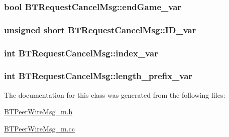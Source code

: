 \subsubsection[{end\+Game\+\_\+var}]{\setlength{\rightskip}{0pt plus 5cm}bool B\+T\+Request\+Cancel\+Msg\+::end\+Game\+\_\+var\hspace{0.3cm}{\ttfamily [protected]}}\label{classBTRequestCancelMsg_a8ebc13d1af28901ca455cbda02c29d52}
\hypertarget{classBTRequestCancelMsg_ad687b551062827df1f6f9a65b6c19782}{}
\subsubsection[{I\+D\+\_\+var}]{\setlength{\rightskip}{0pt plus 5cm}unsigned short B\+T\+Request\+Cancel\+Msg\+::\+I\+D\+\_\+var\hspace{0.3cm}{\ttfamily [protected]}}\label{classBTRequestCancelMsg_ad687b551062827df1f6f9a65b6c19782}
\hypertarget{classBTRequestCancelMsg_a1a29c76d5ddedc01a0acd16e2bc5d486}{}
\subsubsection[{index\+\_\+var}]{\setlength{\rightskip}{0pt plus 5cm}int B\+T\+Request\+Cancel\+Msg\+::index\+\_\+var\hspace{0.3cm}{\ttfamily [protected]}}\label{classBTRequestCancelMsg_a1a29c76d5ddedc01a0acd16e2bc5d486}
\hypertarget{classBTRequestCancelMsg_a77139c7bdc2e1a7885f20ddbb25acf5d}{}
\subsubsection[{length\+\_\+prefix\+\_\+var}]{\setlength{\rightskip}{0pt plus 5cm}int B\+T\+Request\+Cancel\+Msg\+::length\+\_\+prefix\+\_\+var\hspace{0.3cm}{\ttfamily [protected]}}\label{classBTRequestCancelMsg_a77139c7bdc2e1a7885f20ddbb25acf5d}


The documentation for this class was generated from the following files\+:\begin{DoxyCompactItemize}
\item 
\hyperlink{BTPeerWireMsg__m_8h}{B\+T\+Peer\+Wire\+Msg\+\_\+m.\+h}\item 
\hyperlink{BTPeerWireMsg__m_8cc}{B\+T\+Peer\+Wire\+Msg\+\_\+m.\+cc}\end{DoxyCompactItemize}
